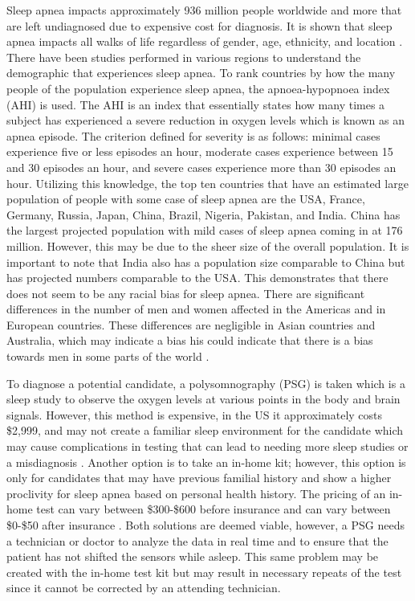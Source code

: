 \documentclass[12pt,titlepage]{article}
\begin{document}
Sleep apnea impacts approximately 936 million people worldwide and more that are left undiagnosed due to expensive cost for diagnosis.
It is shown that sleep apnea impacts all walks of life regardless of gender, age, ethnicity, and location \cite{atsjournals}. There have
been studies performed in various regions to understand the demographic that experiences sleep apnea. To rank countries by how the many
people of the population experience sleep apnea, the apnoea-hypopnoea index (AHI) is used. The AHI is an index that essentially states
how many times a subject has experienced a severe reduction in oxygen levels which is known as an apnea episode. The criterion defined
for severity is as follows: minimal cases experience five or less episodes an hour, moderate cases experience between 15 and 30 episodes
an hour, and severe cases experience more than 30 episodes an hour. Utilizing this knowledge, the top ten countries that have an estimated
large population of people with some case of sleep apnea are the USA, France, Germany, Russia, Japan, China, Brazil, Nigeria, Pakistan,
and India. China has the largest projected population with mild cases of sleep apnea coming in at 176 million. However, this may be due to
the sheer size of the overall population. It is important to note that India also has a population size comparable to China but has projected
numbers comparable to the USA. This demonstrates that there does not seem to be any racial bias for sleep apnea. There are significant
differences in the number of men and women affected in the Americas and in European countries. These differences are negligible in Asian
countries and Australia, which may indicate a bias his could indicate that there is a bias towards men in some parts of the world
\cite{benjafield}.

To diagnose a potential candidate, a polysomnography (PSG) is taken which is a sleep study to observe the oxygen levels at various points in
the body and brain signals. However, this method is expensive, in the US it approximately costs \$2,999, and may not create a familiar sleep
environment for the candidate which may cause complications in testing that can lead to needing more sleep studies or a misdiagnosis
\cite{mdsave}. Another option is to take an in-home kit; however, this option is only for candidates that may have previous familial
history and show a higher proclivity for sleep apnea based on personal health history. The pricing of an in-home test can vary between
\$300-\$600 before insurance and can vary between \$0-\$50 after insurance \cite{rodriguez_2016}. Both solutions are deemed viable,
however, a PSG needs a technician or doctor to analyze the data in real time and to ensure that the patient has not shifted the sensors
while asleep. This same problem may be created with the in-home test kit but may result in necessary repeats of the test since it cannot
be corrected by an attending technician.
\end{document}
